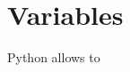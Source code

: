 \documentclass[12pt, letterpaper]{article}
\begin{document}
    \section*{Variables}
    Python allows to 
\end{document}
